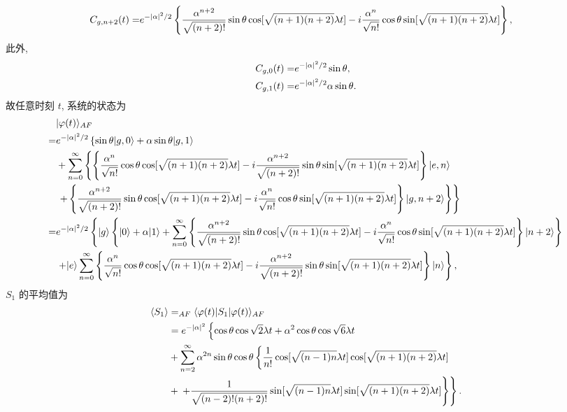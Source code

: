 \documentclass{assignment}
\begin{document}
\begin{sol}
\begin{align}
        C_{g,n+2}(t)=&e^{-\left\lvert\alpha\right\rvert^2/2}\left\{\frac{\alpha^{n+2}}{\sqrt{(n+2)!}}\sin\theta\cos[\sqrt{(n+1)(n+2)}\lambda t]-i\frac{\alpha^n}{\sqrt{n!}}\cos\theta\sin[\sqrt{(n+1)(n+2)}\lambda t]\right\},
    \end{align}
    此外,
    \begin{align}
        C_{g,0}(t)=&e^{-\left\lvert\alpha\right\rvert^2/2}\sin\theta,\\
        C_{g,1}(t)=&e^{-\left\lvert\alpha\right\rvert^2/2}\alpha\sin\theta.
    \end{align}
    故任意时刻 $t$, 系统的状态为
    {\small
    \begin{align}
        \notag&\lvert\varphi(t)\rangle_{AF}\\
        \notag=&e^{-\left\lvert\alpha\right\rvert^2/2}\left\{\sin\theta\lvert g,0\rangle+\alpha\sin\theta\lvert g,1\rangle\right.\\
        \notag&+\sum_{n=0}^{\infty}\left\{\left\{\frac{\alpha^n}{\sqrt{n!}}\cos\theta\cos[\sqrt{(n+1)(n+2)}\lambda t]-i\frac{\alpha^{n+2}}{\sqrt{(n+2)!}}\sin\theta\sin[\sqrt{(n+1)(n+2)}\lambda t]\right\}\lvert e,n\rangle\right.\\
        \notag&\left.\left.+\left\{\frac{\alpha^{n+2}}{\sqrt{(n+2)!}}\sin\theta\cos[\sqrt{(n+1)(n+2)}\lambda t]-i\frac{\alpha^n}{\sqrt{n!}}\cos\theta\sin[\sqrt{(n+1)(n+2)}\lambda t]\right\}\lvert g,n+2\rangle\right\}\right\}\\
        \notag=&e^{-\left\lvert\alpha\right\rvert^2/2}\left\{\lvert g\rangle\left\{\lvert 0\rangle+\alpha\lvert 1\rangle+\sum_{n=0}^{\infty}\left\{\frac{\alpha^{n+2}}{\sqrt{(n+2)!}}\sin\theta\cos[\sqrt{(n+1)(n+2)}\lambda t]-i\frac{\alpha^n}{\sqrt{n!}}\cos\theta\sin[\sqrt{(n+1)(n+2)}\lambda t]\right\}\lvert n+2\rangle\right\}\right.\\
        &\left.+\lvert e\rangle\sum_{n=0}^{\infty}\left\{\frac{\alpha^n}{\sqrt{n!}}\cos\theta\cos[\sqrt{(n+1)(n+2)}\lambda t]-i\frac{\alpha^{n+2}}{\sqrt{(n+2)!}}\sin\theta\sin[\sqrt{(n+1)(n+2)}\lambda t]\right\}\lvert n\rangle\right\},
    \end{align}
    }
    $S_1$ 的平均值为
    \begin{align}
        \notag\langle S_1\rangle&=_{AF}\langle\varphi(t)\rvert S_1\lvert\varphi(t)\rangle_{AF}\\
        \notag&=e^{-\left\lvert\alpha\right\rvert^2}\left\{\cos\theta\cos\sqrt{2}\lambda t+\alpha^2\cos\theta\cos\sqrt{6}\lambda t\right.\\
        \notag&+\sum_{n=2}^{\infty}\alpha^{2n}\sin\theta\cos\theta\left\{\frac{1}{n!}\cos[\sqrt{(n-1)n}\lambda t]\cos[\sqrt{(n+1)(n+2)}\lambda t]\right.\\
        &+\left.\left.+\frac{1}{\sqrt{(n-2)!(n+2)!}}\sin[\sqrt{(n-1)n}\lambda t]\sin[\sqrt{(n+1)(n+2)}\lambda t]\right\}\right\}.
    \end{align}
\end{sol}
\end{document}
